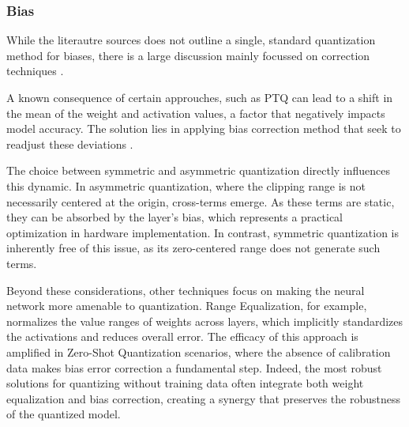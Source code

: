 \subsubsection*{Bias}



While the literautre sources does not outline a single, standard quantization method for biases, there is a large discussion mainly focussed on correction techniques \cite{Zhu2020Survey}. 


A known consequence of certain approuches, such as PTQ can lead to a shift in the mean of the weight and activation values, a factor that negatively impacts model accuracy. The solution lies in applying bias correction method that seek to readjust these deviations \cite{Zhu2020Survey}.

The choice between symmetric and asymmetric quantization directly influences this dynamic. In asymmetric quantization, where the clipping range is not necessarily centered at the origin, cross-terms emerge. As these terms are static, they can be absorbed by the layer's bias, which represents a practical optimization in hardware implementation. In contrast, symmetric quantization is inherently free of this issue, as its zero-centered range does not generate such terms.

Beyond these considerations, other techniques focus on making the neural network more amenable to quantization. Range Equalization, for example, normalizes the value ranges of weights across layers, which implicitly standardizes the activations and reduces overall error. The efficacy of this approach is amplified in Zero-Shot Quantization scenarios, where the absence of calibration data makes bias error correction a fundamental step. Indeed, the most robust solutions for quantizing without training data often integrate both weight equalization and bias correction, creating a synergy that preserves the robustness of the quantized model.

